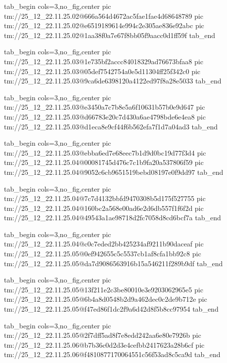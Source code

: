  
 
 
 
 

\qqSecCmtScr


\ifcmt
  tab_begin cols=3,no_fig,center
    pic tm://25_12_22.11.25.02@666a564d4672ac5fae1fae4d68648789
    pic tm://25_12_22.11.25.02@e6519189614e994c2e305ae836e92abc
    pic tm://25_12_22.11.25.02@1aa38f0a7e67f8bb05f9aacc0d1ff59f
  tab_end
\fi


\ifcmt
  tab_begin cols=3,no_fig,center
    pic tm://25_12_22.11.25.03@1e735bf2accc84018329ad76673bfaa8
    pic tm://25_12_22.11.25.03@05def7542754a0e5d11304ff25f342c0
    pic tm://25_12_22.11.25.03@9ca6de6398120a4122ed97f8a28e5033
  tab_end
\fi


\ifcmt
  tab_begin cols=3,no_fig,center
    pic tm://25_12_22.11.25.03@e3450a7c7b8e5a6f10631b57b0e9d647
    pic tm://25_12_22.11.25.03@d66783e20c7d430a6ae4798bde6e4ea8
    pic tm://25_12_22.11.25.03@d1eca8e9cf44f6b562efa7f1d7a04ad3
  tab_end
\fi


\ifcmt
  tab_begin cols=3,no_fig,center
    pic tm://25_12_22.11.25.03@ebba6ed7e68eec7b1d9d0bc19d77f3d4
    pic tm://25_12_22.11.25.04@00081745d476c7c1b9fa20a537806f59
    pic tm://25_12_22.11.25.04@9052c6cb9651519bebd08197e0f9dd97
  tab_end
\fi


\ifcmt
  tab_begin cols=3,no_fig,center
    pic tm://25_12_22.11.25.04@7c7d4132bbfd9470308b5d175f527755
    pic tm://25_12_22.11.25.04@160bc2a568e00ad6e2d6db557f1f6f2d
    pic tm://25_12_22.11.25.04@49543a1ae98718d2fc7058d8cd6bcf7a
  tab_end
\fi


\ifcmt
  tab_begin cols=3,no_fig,center
    pic tm://25_12_22.11.25.04@c0c7eded2bb425234af9211b90daceaf
    pic tm://25_12_22.11.25.05@0ef942655c5c5537cb1af8cfa1bb92c8
    pic tm://25_12_22.11.25.05@da7d9086563916b15a546211f289b9df
  tab_end
\fi


\ifcmt
  tab_begin cols=3,no_fig,center
    pic tm://25_12_22.11.25.05@13f211e2c3be80010e3e9203062965e5
    pic tm://25_12_22.11.25.05@6b4a8d0548b2d9a462dec0c2de9b712e
    pic tm://25_12_22.11.25.05@f47ed86f1dc2f9a6d42d8f5b8cc97954
  tab_end
\fi


\ifcmt
  tab_begin cols=3,no_fig,center
    pic tm://25_12_22.11.25.05@2f7dff5ad8f7e8edd242aa6e80e7926b
    pic tm://25_12_22.11.25.06@b7b36c0d2d3e4cefbb2417623a28b6cf
    pic tm://25_12_22.11.25.06@f4810877170064551c56f53ad8c5ca9d
  tab_end
\fi


